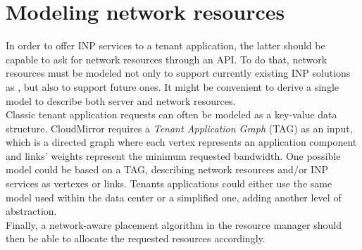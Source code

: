 \documentclass[letterpaper,twocolumn,10pt]{article}
\begin{document}
\section{Modeling network resources}
In order to offer INP services to a tenant application, the latter should be capable to ask for network resources through an API. To do that, network resources must be modeled not only to support currently existing INP solutions as \cite{daiet} \cite{netchain} \cite{incbricks} \cite{sharp}, but also to support future ones. It might be convenient to derive a single model to describe both server and network resources.\\
Classic tenant application requests can often be modeled as a key-value data structure. CloudMirror \cite{cloudmirror} requires a \textit{Tenant Application Graph} (TAG) as an input, which is a directed graph where each vertex represents an application component and links' weights represent the minimum requested bandwidth. One possible model could be based on a TAG, describing network resources and/or INP services as vertexes or links. Tenants applications could either use the same model used within the data center or a simplified one, adding another level of abstraction.\\
Finally, a network-aware placement algorithm in the resource manager should then be able to allocate the requested resources accordingly.



\end{document}
